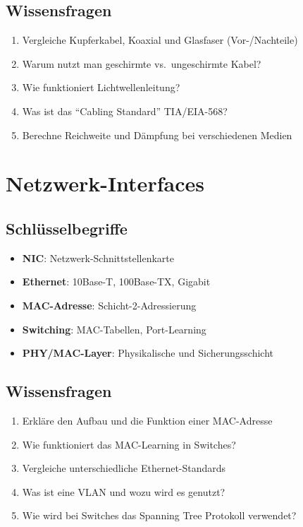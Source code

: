\documentclass[12pt,a4paper,german]{report}
\begin{document}
\section{Wissensfragen}
\begin{enumerate}
    \item Vergleiche Kupferkabel, Koaxial und Glasfaser (Vor-/Nachteile)
    \item Warum nutzt man geschirmte vs.\ ungeschirmte Kabel?
    \item Wie funktioniert Lichtwellenleitung?
    \item Was ist das ``Cabling Standard'' TIA/EIA-568?
    \item Berechne Reichweite und Dämpfung bei verschiedenen Medien
\end{enumerate}

\chapter{Netzwerk-Interfaces}

\section{Schlüsselbegriffe}
\begin{itemize}
    \item \textbf{NIC}: Netzwerk-Schnittstellenkarte
    \item \textbf{Ethernet}: 10Base-T, 100Base-TX, Gigabit
    \item \textbf{MAC-Adresse}: Schicht-2-Adressierung
    \item \textbf{Switching}: MAC-Tabellen, Port-Learning
    \item \textbf{PHY/MAC-Layer}: Physikalische und Sicherungsschicht
\end{itemize}

\section{Wissensfragen}
\begin{enumerate}
    \item Erkläre den Aufbau und die Funktion einer MAC-Adresse
    \item Wie funktioniert das MAC-Learning in Switches?
    \item Vergleiche unterschiedliche Ethernet-Standards
    \item Was ist eine VLAN und wozu wird es genutzt?
    \item Wie wird bei Switches das Spanning Tree Protokoll verwendet?
\end{enumerate}
\end{document}
